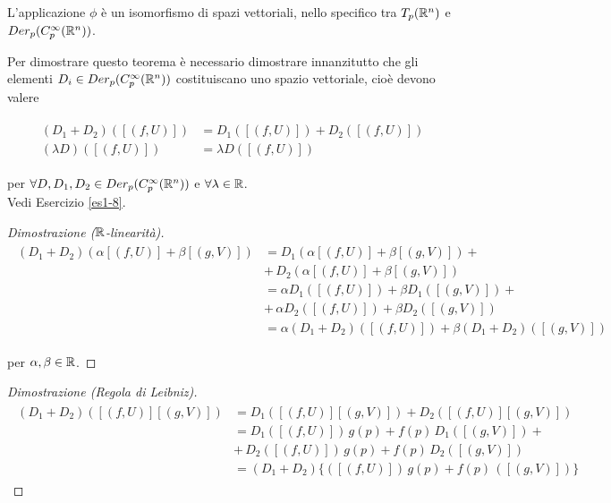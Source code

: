 \begin{theorem}
	L'applicazione $ \phi $ è un isomorfismo di spazi vettoriali, nello specifico tra $ T_{p}(\mathbb{R}^{n}) $ e $ Der_{p}(C_{p}^{\infty}(\mathbb{R}^{n})) $.
\end{theorem}

Per dimostrare questo teorema è necessario dimostrare innanzitutto che gli elementi $ D_{i} \in Der_{p}(C_{p}^{\infty}(\mathbb{R}^{n})) $ costituiscano uno spazio vettoriale, cioè devono valere

\begin{align}
	\begin{split}
		(D_{1} + D_{2}) ([(f,U)]) &= D_{1}([(f,U)]) + D_{2}([(f,U)])\\
		(\lambda D) ([(f,U)]) &= \lambda D ([(f,U)])
	\end{split}
\end{align}

per $ \forall D,D_{1},D_{2} \in Der_{p}(C_{p}^{\infty}(\mathbb{R}^{n})) $ e $ \forall \lambda \in \mathbb{R} $.\\
Vedi Esercizio \ref{es1-8}.

\begin{proof}[Dimostrazione ($ \mathbb{R} $-linearità)]
	\begin{align}
		\begin{split}
			(D_{1} + D_{2}) (\alpha [(f,U)] + \beta [(g,V)]) &= D_{1} (\alpha [(f,U)] + \beta [(g,V)]) +\\
			&+ \, D_{2} (\alpha [(f,U)] + \beta [(g,V)])\\
			&= \alpha D_{1} ([(f,U)]) + \beta D_{1} ([(g,V)]) +\\
			&+ \,\alpha D_{2} ([(f,U)]) + \beta D_{2} ([(g,V)])\\
			&= \alpha (D_{1} + D_{2}) ([(f,U)]) + \beta (D_{1} + D_{2}) ([(g,V)])
		\end{split}
	\end{align}

	per $ \alpha,\beta \in \mathbb{R} $.
\end{proof}

\begin{proof}[Dimostrazione (Regola di Leibniz)]
	\begin{align}
		\begin{split}
			(D_{1} + D_{2}) ([(f,U)] [(g,V)]) &= D_{1} ([(f,U)] [(g,V)]) + D_{2} ([(f,U)] [(g,V)])\\
			&= D_{1} ([(f,U)]) \, g(p) + f(p) \, D_{1} ([(g,V)]) +\\
			&+ \, D_{2} ([(f,U)]) \, g(p) + f(p) \, D_{2} ([(g,V)])\\
			&= (D_{1} + D_{2}) \{ ([(f,U)]) \, g(p) + f(p) \, ([(g,V)]) \}
		\end{split}
	\end{align}
\end{proof}

